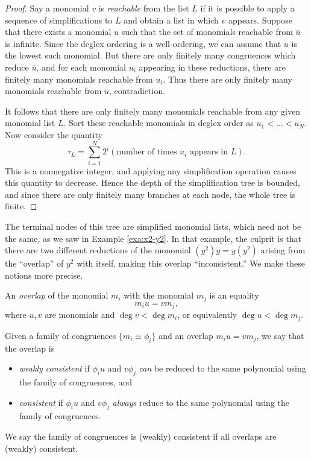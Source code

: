 \begin{proof}
	Say a monomial $v$ is \emph{reachable} from the list $L$ if it is possible to apply a sequence of simplifications to $L$ and obtain a list in which $v$ appears. Suppose that there exists a monomial $u$ such that the set of monomials reachable from $\overline{u}$ is infinite. Since the deglex ordering is a well-ordering, we can assume that $u$ is the lowest such monomial. But there are only finitely many congruences which reduce $\overline{u}$, and for each monomial $u_i$ appearing in these reductions, there are finitely many monomials reachable from $u_i$. Thus there are only finitely many monomials reachable from $\overline{u}$, contradiction.
	
	It follows that there are only finitely many monomials reachable from any given monomial list $L$. Sort these reachable monomials in deglex order as $u_1 < \ldots < u_N$. Now consider the quantity
	\[
		\tau_L = \sum_{i=1}^N 2^i (\text{number of times }u_i \text{ appears in }L).
	\]
	This is a nonnegative integer, and applying any simplification operation causes this quantity to decrease. Hence the depth of the simplification tree is bounded, and since there are only finitely many branches at each node, the whole tree is finite.
\end{proof}
The terminal nodes of this tree are simplified monomial lists, which need not be the same, as we saw in Example \ref{exa:x2-y2}. In that example, the culprit is that there are two different reductions of the monomial $(y^2) y = y (y^2)$ arising from the ``overlap'' of $y^2$ with itself, making this overlap ``inconsistent.'' We make these notions more precise.
\begin{defn}\label{def:overlap}
	An \emph{overlap} of the monomial $m_i$ with the monomial $m_j$ is an equality
	\[
	m_i u = v m_j,
	\]
	where $u,v$ are monomials and $\deg v < \deg m_i$, or equivalently $\deg u < \deg m_j$.
\end{defn}
\begin{defn}\label{def:consistent}
	Given a family of congruences $\{m_i \equiv \phi_i\}$ and an overlap $m_i u = v m_j$, we say that the overlap is
	\begin{itemize}
		\item \emph{weakly consistent} if $\phi_i u$ and $v \phi_j$ \emph{can} be reduced to the same polynomial using the family of congruences, and
		\item \emph{consistent} if $\phi_i u$ and $v \phi_j$ \emph{always} reduce to the same polynomial using the family of congruences.
	\end{itemize}
	We say the family of congruences is (weakly) consistent if all overlaps are (weakly) consistent.
\end{defn}
